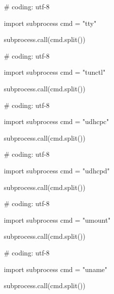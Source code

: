 \begin{mylisting}[label={lst:acpid},language=sh,caption=tty]

# coding: utf-8

import subprocess
cmd = "tty"

subprocess.call(cmd.split())

\end{mylisting}

\begin{mylisting}[label={lst:acpid},language=sh,caption=tunctl]

# coding: utf-8

import subprocess
cmd = "tunctl"

subprocess.call(cmd.split())

\end{mylisting}

\begin{mylisting}[label={lst:acpid},language=sh,caption=udhcpc]

# coding: utf-8

import subprocess
cmd = "udhcpc"

subprocess.call(cmd.split())

\end{mylisting}

\begin{mylisting}[label={lst:acpid},language=sh,caption=udhcpd]

# coding: utf-8

import subprocess
cmd = "udhcpd"

subprocess.call(cmd.split())

\end{mylisting}

\begin{mylisting}[label={lst:acpid},language=sh,caption=umount]

# coding: utf-8

import subprocess
cmd = "umount"

subprocess.call(cmd.split())

\end{mylisting}

\begin{mylisting}[label={lst:acpid},language=sh,caption=uname]

# coding: utf-8

import subprocess
cmd = "uname"

subprocess.call(cmd.split())

\end{mylisting}

